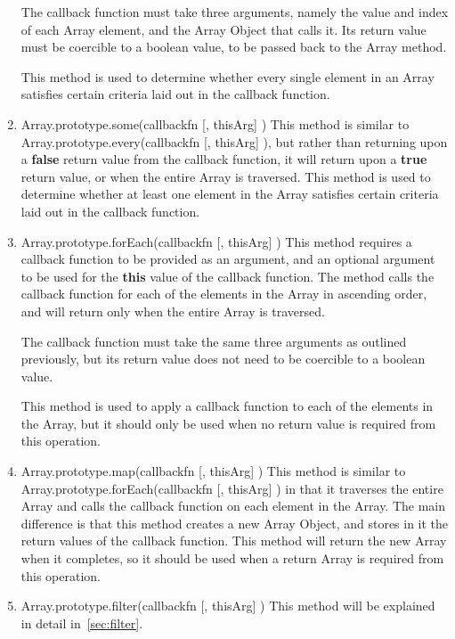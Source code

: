 \documentclass[a4paper,11pt,twoside]{report}
\begin{document}
\begin{enumerate}
The callback function must take three arguments, namely the value and index of each Array element, and the Array Object that calls it. Its return value must be coercible to a boolean value, to be passed back to the Array method.

This method is used to determine whether every single element in an Array satisfies certain criteria laid out in the callback function.

\item Array.prototype.some(callbackfn [, thisArg] ) \newline
This method is similar to Array.prototype.every(callbackfn [, thisArg] ), but rather than returning upon a \textbf{false} return value from the callback function, it will return upon a \textbf{true} return value, or when the entire Array is traversed. This method is used to determine whether at least one element in the Array satisfies certain criteria laid out in the callback function.

\item Array.prototype.forEach(callbackfn [, thisArg] ) \newline
This method requires a callback function to be provided as an argument, and an optional argument to be used for the \textbf{this} value of the callback function. The method calls the callback function for each of the elements in the Array in ascending order, and will return only when the entire Array is traversed.

The callback function must take the same three arguments as outlined previously, but its return value does not need to be coercible to a boolean value.

This method is used to apply a callback function to each of the elements in the Array, but it should only be used when no return value is required from this operation.

\item Array.prototype.map(callbackfn [, thisArg] ) \newline
This method is similar to Array.prototype.forEach(callbackfn [, thisArg] ) in that it traverses the entire Array and calls the callback function on each element in the Array. The main difference is that this method creates a new Array Object, and stores in it the return values of the callback function. This method will return the new Array when it completes, so it should be used when a return Array is required from this operation.

\item Array.prototype.filter(callbackfn [, thisArg] ) \newline
This method will be explained in detail in~\ref{sec:filter}.


\end{enumerate}
\end{document}
